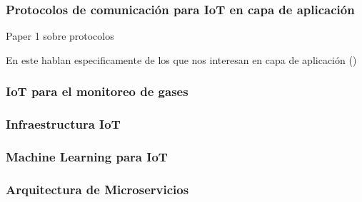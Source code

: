 \documentclass[stu,12pt,floatsintext]{apa7}
\begin{document}
	\subsubsection{Protocolos de comunicación para IoT en capa de aplicación}
	Paper 1 sobre protocolos \cite{en13112762}
	
	En este hablan especificamente de los que nos interesan en capa de aplicación \cite{YUGHA2020102763} ()
	
	\subsubsection{IoT para el monitoreo de gases}
	
	\subsubsection{Infraestructura IoT}
	
	\subsubsection{Machine Learning para IoT}
	
	
	\subsubsection{Arquitectura de Microservicios}
	
	
	
\end{document}
